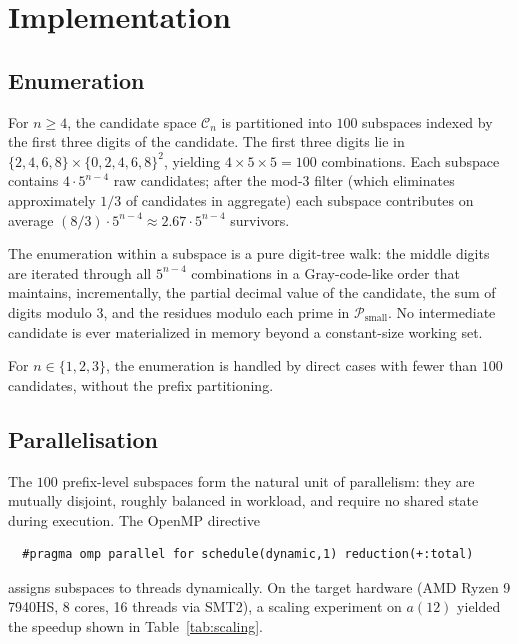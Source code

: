 \documentclass[11pt,a4paper]{article}
\theoremstyle{definition}
\begin{document}
\section{Implementation}\label{sec:algo}

\subsection{Enumeration}\label{sec:enum}

For $n \geq 4$, the candidate space $\mathcal{C}_n$ is partitioned into $100$
subspaces indexed by the first three digits of the candidate. The first
three digits lie in $\{2,4,6,8\} \times \{0,2,4,6,8\}^2$, yielding
$4 \times 5 \times 5 = 100$ combinations. Each subspace contains
$4 \cdot 5^{n-4}$ raw candidates; after the mod-3 filter (which eliminates
approximately $1/3$ of candidates in aggregate) each subspace contributes
on average $(8/3) \cdot 5^{n-4} \approx 2.67 \cdot 5^{n-4}$ survivors.

The enumeration within a subspace is a pure digit-tree walk: the middle
digits are iterated through all $5^{n-4}$ combinations in a Gray-code-like
order that maintains, incrementally, the partial decimal value of the
candidate, the sum of digits modulo $3$, and the residues modulo each
prime in $\mathcal{P}_{\mathrm{small}}$. No intermediate candidate is ever
materialized in memory beyond a constant-size working set.

For $n \in \{1, 2, 3\}$, the enumeration is handled by direct cases with
fewer than $100$ candidates, without the prefix partitioning.

\subsection{Parallelisation}\label{sec:omp}

The $100$ prefix-level subspaces form the natural unit of parallelism:
they are mutually disjoint, roughly balanced in workload, and require no
shared state during execution. The OpenMP directive
\begin{verbatim}
  #pragma omp parallel for schedule(dynamic,1) reduction(+:total)
\end{verbatim}
assigns subspaces to threads dynamically. On the target hardware (AMD
Ryzen 9 7940HS, 8 cores, 16 threads via SMT2), a scaling experiment on
$a(12)$ yielded the speedup shown in Table~\ref{tab:scaling}.
\end{document}
